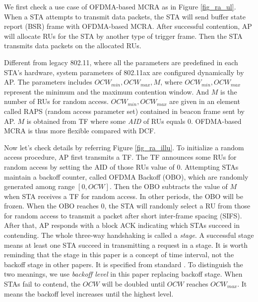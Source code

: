 \documentclass[journal]{IEEEtran}
\begin{document}
We first check a use case of OFDMA-based MCRA as in Figure \ref{fig_ra_ul}.
When a STA attempts to transmit data packets, the STA will send buffer state report (BSR) frame with OFDMA-based MCRA. 
After successful contention, AP will allocate RUs for the STA by another type of trigger frame.
Then the STA transmits data packets on the allocated RUs.

Different from legacy 802.11, where all the parameters are predefined in each STA's hardware, system parameters of 802.11ax are configured dynamically by AP. 
The parameters includes $OCW_{min}, OCW_{max}, M$, where $OCW_{min}, OCW_{max}$ represent the minimum and the maximum contention window. 
And $M$ is the number of RUs for random access. 
$OCW_{min}, OCW_{max}$ are given in an element called RAPS (random access parameter set) contained in beacon frame sent by AP. 
$M$ is obtained from TF where some \textit{AID} of RUs equals 0.
OFDMA-based MCRA is thus more flexible compared with DCF.

Now let's check details by referring Figure \ref{fig_ra_illu}. 
To initialize a random access procedure, AP first transmits a TF. 
The TF announces some RUs for random access by setting the AID of those RUs value of 0. 
Attempting STAs maintain a backoff counter, called OFDMA Backoff (OBO), which are randomly generated among range $[0, OCW]$. 
Then the OBO subtracts the value of $M$ when STA receives a TF for random access. In other periods, the OBO will be frozen. 
When the OBO reaches 0, the STA will randomly select a RU from those for random access to transmit a packet after short inter-frame spacing (SIFS). 
After that, AP responds with a block ACK indicating which STAs succeed in contending. The whole three-way handshaking is called a \textit{stage}. 
A successful stage means at least one STA succeed in transmitting a request in a stage. 
It is worth reminding that the stage in this paper is a concept of time interval, not the backoff stage in other papers. 
It is specified from standard \cite{draft_ax}. 
To distinguish the two meanings, we use \textit{backoff level} in this paper replacing backoff stage.  
When STAs fail to contend, the $OCW$ will be doubled until $OCW$ reaches $OCW_{max}$. 
It means the backoff level increases until the highest level.
\end{document}
